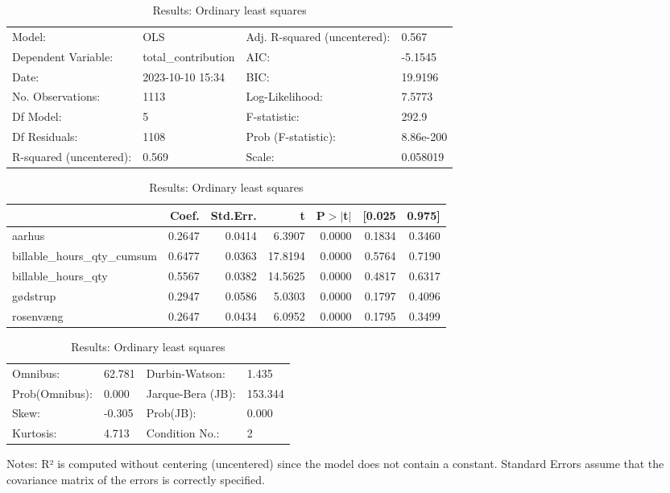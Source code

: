 \begin{table}
\caption{Results: Ordinary least squares}
\label{}
\begin{center}
\begin{tabular}{llll}
\hline
Model:                  & OLS                 & Adj. R-squared (uncentered): & 0.567      \\
Dependent Variable:     & total\_contribution & AIC:                         & -5.1545    \\
Date:                   & 2023-10-10 15:34    & BIC:                         & 19.9196    \\
No. Observations:       & 1113                & Log-Likelihood:              & 7.5773     \\
Df Model:               & 5                   & F-statistic:                 & 292.9      \\
Df Residuals:           & 1108                & Prob (F-statistic):          & 8.86e-200  \\
R-squared (uncentered): & 0.569               & Scale:                       & 0.058019   \\
\hline
\end{tabular}
\end{center}

\begin{center}
\begin{tabular}{lrrrrrr}
\hline
                             &  Coef. & Std.Err. &       t & P$> |$t$|$ & [0.025 & 0.975]  \\
\hline
aarhus                       & 0.2647 &   0.0414 &  6.3907 &      0.0000 & 0.1834 & 0.3460  \\
billable\_hours\_qty\_cumsum & 0.6477 &   0.0363 & 17.8194 &      0.0000 & 0.5764 & 0.7190  \\
billable\_hours\_qty         & 0.5567 &   0.0382 & 14.5625 &      0.0000 & 0.4817 & 0.6317  \\
gødstrup                     & 0.2947 &   0.0586 &  5.0303 &      0.0000 & 0.1797 & 0.4096  \\
rosenvæng                    & 0.2647 &   0.0434 &  6.0952 &      0.0000 & 0.1795 & 0.3499  \\
\hline
\end{tabular}
\end{center}

\begin{center}
\begin{tabular}{llll}
\hline
Omnibus:       & 62.781 & Durbin-Watson:    & 1.435    \\
Prob(Omnibus): & 0.000  & Jarque-Bera (JB): & 153.344  \\
Skew:          & -0.305 & Prob(JB):         & 0.000    \\
Kurtosis:      & 4.713  & Condition No.:    & 2        \\
\hline
\end{tabular}
\end{center}
\end{table}
\bigskip
Notes: \newline 
[1] R² is computed without centering (uncentered) since the                 model does not contain a constant. \newline 
[2] Standard Errors assume that the covariance matrix of the errors is correctly specified.